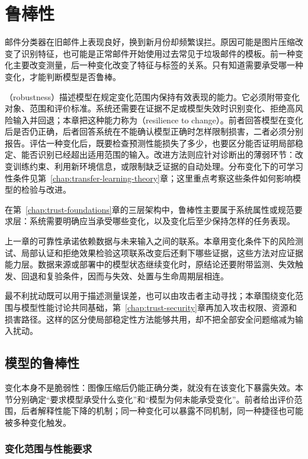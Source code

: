 \chapter{鲁棒性}
\label{chap:trust-robustness}

邮件分类器在旧邮件上表现良好，换到新月份却频繁误拦。原因可能是图片压缩改变了识别特征，也可能是正常邮件开始使用过去常见于垃圾邮件的模板。前一种变化主要改变测量，后一种变化改变了特征与标签的关系。只有知道需要承受哪一种变化，才能判断模型是否鲁棒。

（robustness）描述模型在规定变化范围内保持有效表现的能力。它必须附带变化对象、范围和评价标准。系统还需要在证据不足或模型失效时识别变化、拒绝高风险输入并回退；本章把这种能力称为（resilience to change）。前者回答模型在变化后是否仍正确，后者回答系统在不能确认模型正确时怎样限制损害，二者必须分别报告。评估一种变化后，既要检查预测性能损失了多少，也要区分能否证明局部稳定、能否识别已经超出适用范围的输入。改进方法则应针对诊断出的薄弱环节：改变训练约束、利用新环境信息，或限制缺乏证据的自动处理。分布变化下的可学习性条件见第~\ref{chap:transfer-learning-theory}章；这里重点考察这些条件如何影响模型的检验与改进。

在第~\ref{chap:trust-foundations}章的三层架构中，鲁棒性主要属于系统属性或规范要求层：系统需要明确应当承受哪些变化，以及变化后至少保持怎样的任务表现。

上一章的可靠性承诺依赖数据与未来输入之间的联系。本章用变化条件下的风险测试、局部认证和拒绝效果检验这项联系改变后还剩下哪些证据，这些方法对应证据能力层。数据来源或部署中的模型状态继续变化时，原结论还要附带监测、失效触发、回退和复验条件，因而与失效、处置与生命周期层相连。

最不利扰动既可以用于描述测量误差，也可以由攻击者主动寻找；本章围绕变化范围与模型性能讨论共同基础，第~\ref{chap:trust-security}章再加入攻击权限、资源和损害路径。这样的区分使局部稳定性方法能够共用，却不把全部安全问题缩减为输入扰动。

\section{模型的鲁棒性}
\label{sec:robustness-fragility}

变化本身不是脆弱性：图像压缩后仍能正确分类，就没有在该变化下暴露失效。本节分别确定“要求模型承受什么变化”和“模型为何未能承受变化”。前者给出评价范围，后者解释性能下降的机制；同一种变化可以暴露不同机制，同一种捷径也可能被多种变化触发。

\subsection{变化范围与性能要求}
\label{sec:robustness-change-scope}

